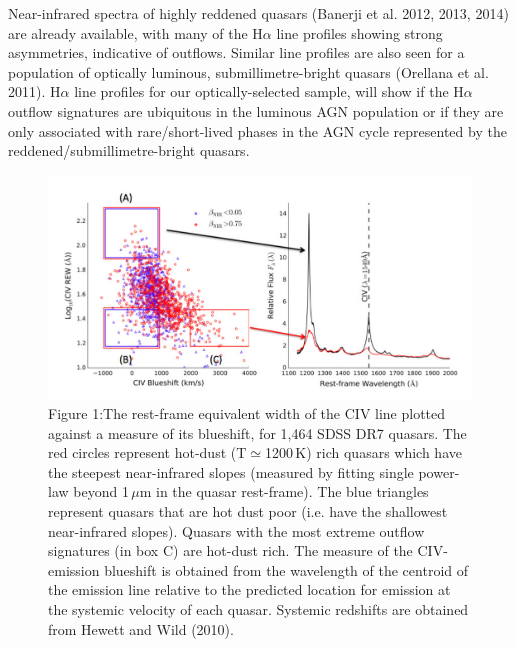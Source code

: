 Near-infrared spectra of highly reddened quasars (Banerji et
al. 2012, 2013, 2014) are already available, with many of the
H$\alpha$ line profiles showing strong asymmetries, indicative of
outflows. Similar line profiles are also seen for a population of
optically luminous, submillimetre-bright quasars (Orellana et
al. 2011). H$\alpha$ line profiles for our optically-selected sample,
will show if the H$\alpha$ outflow signatures are ubiquitous in the
luminous AGN population or if they are only associated with
rare/short-lived phases in the AGN cycle represented by the
reddened/submillimetre-bright quasars.



\begin{figure}
\centering
  \includegraphics[width=\columnwidth]{figures/chapter06/wht_coatman_fig1.pdf}
\caption{Figure 1:The rest-frame equivalent width of the CIV line
plotted against a measure of its blueshift, for 1,464 SDSS DR7
quasars. The red circles represent hot-dust (T$\simeq$1200\,K) rich
quasars which have the steepest near-infrared slopes (measured by
fitting single power-law beyond 1\,$\mu$m in the quasar rest-frame). The
blue triangles represent quasars that are hot dust poor (i.e. have the
shallowest near-infrared slopes). Quasars with the most extreme
outflow signatures (in box C) are hot-dust rich. The measure of the CIV-emission blueshift is obtained from the
wavelength of the centroid of the emission line relative to the
predicted location for emission at the systemic velocity of each
quasar. Systemic redshifts are obtained from Hewett and Wild (2010).}
  \label{fig:}
\end{figure}

